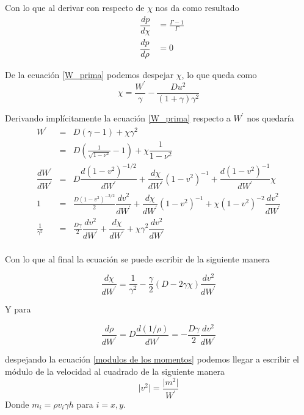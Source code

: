 \documentclass[12pt,a4paper]{book}
\providecommand{\abs}[1]{\lvert#1\rvert} %
\begin{document}
Con lo que al derivar con respecto de $\chi$ nos da como resultado
\begin{eqnarray}\label{der_presion}
& \dfrac{d p}{d \chi}&=\frac{\Gamma-1}{\Gamma}\\ &\dfrac{d p}{d \rho}&= 0
\end{eqnarray}

De la ecuación \ref{W_prima} podemos despejar $\chi$, lo que queda como
\begin{equation}
\chi=\frac{W^{'}}{\gamma}- \frac{D u^{2}}{(1+\gamma)\gamma^{2}}
\end{equation}

Derivando implícitamente la ecuación \ref{W_prima} respecto a $W^{'}$ nos quedaría
\begin{eqnarray*}
W^{'}&=&D\left(\gamma-1 \right) + \chi \gamma^{2}\\%
&=& D\left(\frac{1}{\sqrt{1-\nu^{2}}} -1\right)+\chi \dfrac{1}{1-\nu^{2}} \\%
\dfrac{d W^{'}}{d W^{'}} &=& D \dfrac{d (1-v^2)^{-1/2}}{d W^{'}}+\dfrac{d \chi}{dW^{'}}(1-v^2)^{-1}+\dfrac{d (1-v^2)^{-1} }{d W^{'}}\chi \\  %
1 &=& \frac{D(1-v^2)^{-3/2}}{2} \dfrac{d v^{2}}{d W^{'}}+\dfrac{d \chi}{dW^{'}}(1-v^2)^{-1}+ \chi (1-v^2)^{-2}  \dfrac{d v^{2}}{d W^{'}} \\ %
\frac{1}{\gamma ^2} &=& \frac{D \gamma}{2} \dfrac{d v^{2}}{d W^{'}} + \dfrac{d \chi}{dW^{'}} + \chi \gamma^2 \dfrac{d v^2}{dW^{'}} \\ %
\end{eqnarray*}

Con lo que al final la ecuación se puede escribir de la siguiente manera

\begin{equation}\label{der_chi}
\dfrac{d \chi}{dW^{'}}=\frac{1}{\gamma^2}-\frac{\gamma}{2}(D-2\gamma \chi) \dfrac{d v^2}{dW^{'}}
\end{equation}

Y para

\begin{equation}\label{der_rho}
\dfrac{d \rho}{d W^{'}}= D \dfrac{d\left(1/ \rho \right) }{d W^{'}} = - \frac{D \gamma}{2}  \dfrac{d v^2}{dW^{'}}
\end{equation}

despejando la ecuación \ref{modulos de los momentos} podemos llegar a escribir el módulo de la velocidad al cuadrado de la siguiente manera
\begin{equation}
\abs{v^{2}} = \frac{\abs{m^{2}}}{W^{'}} 
\end{equation}
Donde $m_i= \rho v_i \gamma h$ para $i=x,y$.
\end{document}
